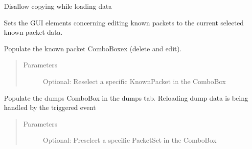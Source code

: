 \documentclass[letterpaper,10pt,english]{sphinxmanual}
\begin{document}
\begin{fulllineitems}
\begin{fulllineitems}
\end{fulllineitems}


\begin{fulllineitems}
\label{\detokenize{src:src.ManagerTab.ManagerTab.loadingData}}
Disallow copying while loading data

\end{fulllineitems}


\begin{fulllineitems}
\label{\detokenize{src:src.ManagerTab.ManagerTab.populateKnownPacketEditLineEdits}}
Sets the GUI elements concerning editing known packets to the current selected known packet data.

\end{fulllineitems}


\begin{fulllineitems}
\label{\detokenize{src:src.ManagerTab.ManagerTab.populateKnownPackets}}
Populate the known packet ComboBoxex (delete and edit).
\begin{quote}\begin{description}
\item[{Parameters}] \leavevmode
{} \textendash{} Optional: Reselect a specific KnownPacket in the ComboBox

\end{description}\end{quote}

\end{fulllineitems}


\begin{fulllineitems}
\label{\detokenize{src:src.ManagerTab.ManagerTab.populatePacketSets}}
Populate the dumps ComboBox in the dumps tab.
Reloading dump data is being handled by the triggered event
\begin{quote}\begin{description}
\item[{Parameters}] \leavevmode
{} \textendash{} Optional: Preselect a specific PacketSet in the ComboBox


\end{description}
\end{quote}
\end{fulllineitems}
\end{fulllineitems}
\end{document}
